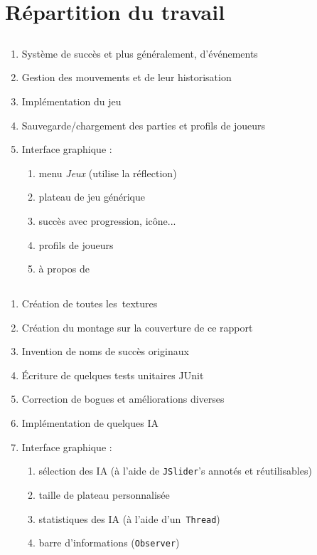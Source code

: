 \section{Répartition du travail}

\subsection{\ghs}
\begin{enumerate}
	\item Système de succès et plus généralement, d'événements
    \item Gestion des mouvements et de leur historisation
    \item Implémentation du jeu \oth
    \item Sauvegarde/chargement des parties et profils de joueurs
    \item Interface graphique :
    \begin{enumerate}
        \item menu \textit{Jeux} (utilise la réflection)
        \item plateau de jeu générique
        \item succès avec progression, icône...
        \item profils de joueurs
        \item à propos de
    \end{enumerate}
\end{enumerate}

\subsection{\mlq}
\begin{enumerate}
	\item Création de toutes les~textures
    \item Création du montage sur la couverture de ce rapport
    \item Invention de noms de succès originaux
    \item Écriture de quelques tests unitaires JUnit
    \item Correction de bogues et améliorations diverses
    \item Implémentation de quelques IA
	\item Interface graphique : 
    \begin{enumerate}
        \item sélection des IA (à l'aide de \texttt{JSlider}'s annotés et réutilisables)
        \item taille de plateau personnalisée
        \item statistiques des IA (à l'aide d'un~\texttt{Thread})
        \item barre d'informations (\texttt{Observer})
    \end{enumerate}
\end{enumerate}
